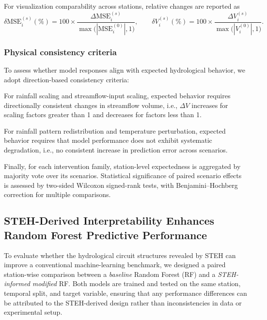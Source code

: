 \documentclass[11pt]{article}
\begin{document}
For visualization comparability across stations, relative changes are reported as
\begin{equation}
    \delta\mathrm{MSE}_{i}^{(s)}(\%) = 100\times\frac{\Delta\mathrm{MSE}_{i}^{(s)}}{\max\big(|\mathrm{MSE}_{i}^{(0)}|,1\big)},
    \qquad
    \delta V_{i}^{(s)}(\%) = 100\times\frac{\Delta V_{i}^{(s)}}{\max\big(|V_{i}^{(0)}|,1\big)}.
\end{equation}

\subsubsection*{Physical consistency criteria}

To assess whether model responses align with expected hydrological behavior, we adopt direction-based consistency criteria\cite{read2019process}:

For rainfall scaling and streamflow-input scaling, expected behavior requires directionally consistent changes in streamflow volume, i.e., $\Delta V$ increases for scaling factors greater than 1 and decreases for factors less than 1\cite{nearing2021role}.

For rainfall pattern redistribution and temperature perturbation, expected behavior requires that model performance does not exhibit systematic degradation, i.e., no consistent increase in prediction error across scenarios\cite{hess-30-1077-2026}.

Finally, for each intervention family, station-level expectedness is aggregated by majority vote over its scenarios. Statistical significance of paired scenario effects is assessed by two-sided Wilcoxon signed-rank tests, with Benjamini--Hochberg correction for multiple comparisons.

\subsection{STEH-Derived Interpretability Enhances Random Forest Predictive Performance}
\label{sec:rfDesign}
To evaluate whether the hydrological circuit structures revealed by STEH can improve a conventional machine-learning benchmark, we designed a paired station-wise comparison between a \emph{baseline} Random Forest (RF) and a \emph{STEH-informed modified} RF\cite{hess-25-2997-2021}. Both models are trained and tested on the same station, temporal split, and target variable, ensuring that any performance differences can be attributed to the STEH-derived design rather than inconsistencies in data or experimental setup\cite{ABBASI2021125717}.
\end{document}
